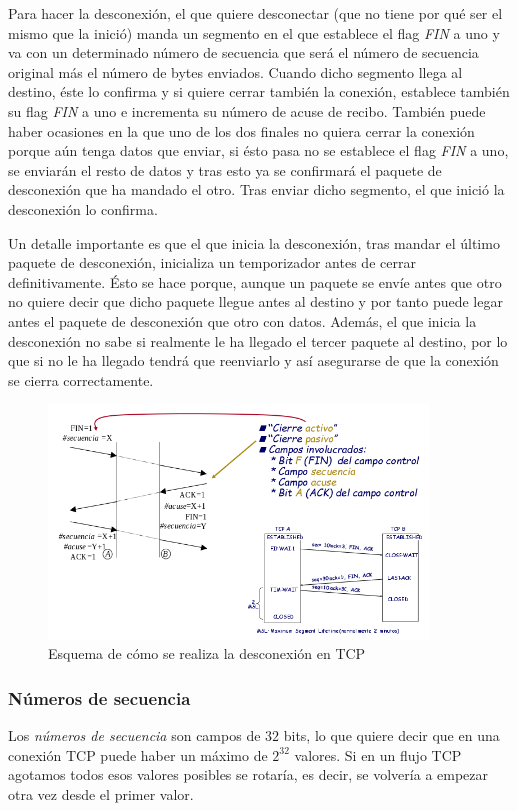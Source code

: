 \documentclass[10pt,a4paper,spanish]{report}
\begin{document}
Para hacer la desconexión, el que quiere desconectar (que no tiene por qué ser el mismo que la inició) manda un segmento en el que establece el flag \textcolor{tema3}{\textit{FIN}} a uno y va con un determinado número de secuencia que será el número de secuencia original más el número de bytes enviados. Cuando dicho segmento llega al destino, éste lo confirma y si quiere cerrar también la conexión, establece también su flag \textcolor{tema3}{\textit{FIN}} a uno e incrementa su número de acuse de recibo. También puede haber ocasiones en la que uno de los dos finales no quiera cerrar la conexión porque aún tenga datos que enviar, si ésto pasa no se establece el flag \textcolor{tema3}{\textit{FIN}} a uno, se enviarán el resto de datos y tras esto ya se confirmará el paquete de desconexión que ha mandado el otro. Tras enviar dicho segmento, el que inició la desconexión lo confirma.

Un detalle importante es que el que inicia la desconexión, tras mandar el último paquete de desconexión, inicializa un temporizador antes de cerrar definitivamente. Ésto se hace porque, aunque un paquete se envíe antes que otro no quiere decir que dicho paquete llegue antes al destino y por tanto puede legar antes el paquete de desconexión que otro con datos. Además, el que inicia la desconexión no sabe si realmente le ha llegado el tercer paquete al destino, por lo que si no le ha llegado tendrá que reenviarlo y así asegurarse de que la conexión se cierra correctamente.

\begin{figure}[!h]
  \centering
  \includegraphics[width=0.9\textwidth]{desconexionhand}
  \caption{Esquema de cómo se realiza la desconexión en TCP}
  \label{desconexionhand}
\end{figure}

\subsubsection{\textcolor{tema3}Números de secuencia}
Los \textit{\textcolor{tema3}{números de secuencia}} son campos de $32$ bits, lo que quiere decir que en una conexión TCP puede haber un máximo de $2^{32}$ valores. Si en un flujo TCP agotamos todos esos valores posibles se rotaría, es decir, se volvería a empezar otra vez desde el primer valor.
\end{document}
